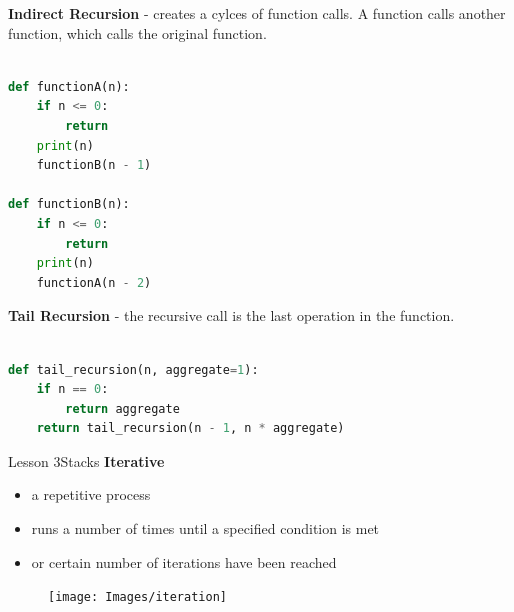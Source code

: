 \documentclass[aspectratio=1610]{beamer}
\begin{document}
\begin{frame}[fragile]
\Large
\textbf{Indirect Recursion} - creates a cylces of function calls. A function calls another function, which calls the original function.\\~\\
\begin{lstlisting}[language=Python]
def functionA(n):
    if n <= 0:
        return
    print(n)
    functionB(n - 1)

def functionB(n):
    if n <= 0:
        return
    print(n)
    functionA(n - 2)
 \end{lstlisting}
\end{frame} 

    
\begin{frame}[fragile]
\Large
\textbf{Tail Recursion} - the recursive call is the last operation in the function.\\~\\
\begin{lstlisting}[language=Python]
def tail_recursion(n, aggregate=1):
    if n == 0:
        return aggregate
    return tail_recursion(n - 1, n * aggregate)
 \end{lstlisting}
\end{frame} 



\begin{frame}{Lesson 3}{Stacks}
\LARGE
\textbf{Iterative}\\
\begin{minipage}{0.60\textwidth}
\begin{itemize}
    \item a repetitive process
    \item runs a number of times until a specified condition is met
    \item or certain number of iterations have been reached
\end{itemize}
  \end{minipage}
\begin{minipage}{.0\textwidth}
      \begin{figure}
        \texttt{[image: Images/iteration]}
      \end{figure}
  \end{minipage}  
\end{frame}
\end{document}
